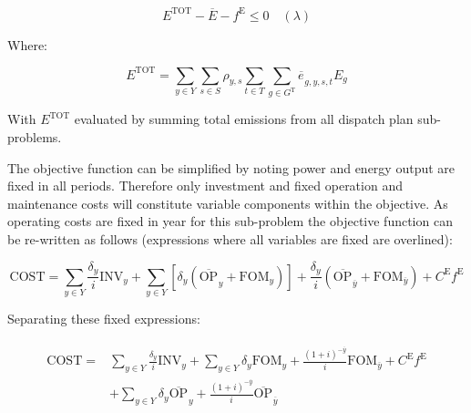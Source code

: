 \documentclass{article}
\newcommand{\sGeneratorsThermal}{G^{\mathrm{T}}}
\newcommand{\sYears}{Y}
\newcommand{\sScenarios}{S}
\newcommand{\sIntervals}{T}
\newcommand{\iGenerator}{g}
\newcommand{\iYear}{y}
\newcommand{\iYearTerminal}{\overline{\iYear}}
\newcommand{\iScenario}{s}
\newcommand{\iInterval}{t}
\newcommand{\cOperatingCost}[1][\iYear,\iScenario]{\mathrm{OP}_{#1}}
\newcommand{\cFixedOperationsMaintenanceCost}[1][\iYear]{\mathrm{FOM}_{#1}}
\newcommand{\cScenarioDuration}[1][\iYear,\iScenario]{\rho_{#1}}
\newcommand{\cEmissionsIntensity}[1][\iGenerator]{E_{#1}}
\newcommand{\cInvestmentCost}[1][\iYear]{\mathrm{INV}_{#1}}
\newcommand{\cInterestRate}{i}
\newcommand{\cEmmissionsCumulativeTarget}{\overline{E}}
\newcommand{\cEmissionsTargetViolationPenalty}{C^{\mathrm{E}}}
\newcommand{\cObjectiveFunction}{\mathrm{COST}}
\newcommand{\cEmissionsTotal}{E^{\mathrm{TOT}}}
\newcommand{\cDiscountRate}[1][\iYear]{\delta_{#1}}
\newcommand{\vEnergy}[1][\iGenerator,\iYear,\iScenario,\iInterval]{e_{#1}}
\newcommand{\vEmissionsTargetViolation}{f^{\mathrm{E}}}
\begin{document}
\begin{equation}
	\cEmissionsTotal - \cEmmissionsCumulativeTarget - \vEmissionsTargetViolation \leq 0 \quad (\lambda)
\end{equation}

Where:

\begin{equation}
	\cEmissionsTotal = \sum\limits_{\iYear \in \sYears} \sum\limits_{\iScenario \in \sScenarios} \cScenarioDuration \sum\limits_{\iInterval \in \sIntervals} \sum\limits_{\iGenerator \in \sGeneratorsThermal} \overline{\vEnergy[]}_{\iGenerator,\iYear,\iScenario,\iInterval} \cEmissionsIntensity
\end{equation}

With $\cEmissionsTotal$ evaluated by summing total emissions from all dispatch plan sub-problems. 

The objective function can be simplified by noting power and energy output are fixed in all periods. Therefore only investment and fixed operation and maintenance costs will constitute variable components within the objective. As operating costs are fixed in year for this sub-problem the objective function can be re-written as follows (expressions where all variables are fixed are overlined): 

\begin{equation}
\cObjectiveFunction = \sum\limits_{\iYear \in \sYears} \frac{\cDiscountRate}{\cInterestRate}\cInvestmentCost + \sum\limits_{\iYear \in \sYears} \left[\cDiscountRate (\overline{\cOperatingCost[]}_{\iYear} + \cFixedOperationsMaintenanceCost) \right] + \frac{\cDiscountRate}{\cInterestRate} \left(\overline{\cOperatingCost[]}_{\iYearTerminal} + \cFixedOperationsMaintenanceCost[\iYearTerminal] \right) + \cEmissionsTargetViolationPenalty \vEmissionsTargetViolation
\end{equation}

Separating these fixed expressions:

\begin{align}
	\begin{split}
		\cObjectiveFunction = &\sum\limits_{\iYear \in \sYears} \frac{\cDiscountRate}{\cInterestRate}\cInvestmentCost + \sum\limits_{\iYear \in \sYears} \cDiscountRate \cFixedOperationsMaintenanceCost  + \frac{(1+\cInterestRate)^{-\iYearTerminal}}{\cInterestRate} \cFixedOperationsMaintenanceCost[\iYearTerminal] + \cEmissionsTargetViolationPenalty \vEmissionsTargetViolation\\
		& + \sum\limits_{\iYear \in \sYears} \cDiscountRate \overline{\cOperatingCost[]}_{\iYear} + \frac{(1+\cInterestRate)^{-\iYearTerminal}}{\cInterestRate} \overline{\cOperatingCost[]}_{\iYearTerminal}
	\end{split}
\end{align}
\end{document}
